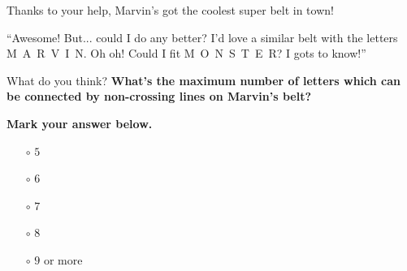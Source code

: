 


Thanks to your help, Marvin's got the coolest super belt in town!

``Awesome! But... could I do any better? I'd love a similar belt with
the letters M~A~R~V~I~N. Oh oh! Could I fit M~O~N~S~T~E~R?
I gots to know!''

What do you think? \textbf{What's the maximum number of letters which
can be connected by non-crossing lines on Marvin's belt?}

\vspace{2em}

\textbf{Mark your answer below.}

\begin{itemize}
  \item[\Huge\(\circ\)] \(5\)
  \item[\Huge\(\circ\)] \(6\)
  \item[\Huge\(\circ\)] \(7\)
  \item[\Huge\(\circ\)] \(8\)
  \item[\Huge\(\circ\)] \(9\) or more
\end{itemize}
